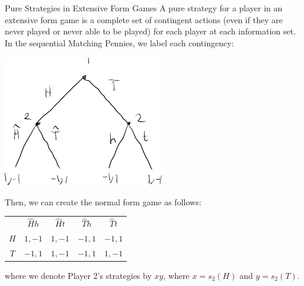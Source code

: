 \documentclass[8pt]{extarticle}
\begin{document}
  \begin{problem}{Pure Strategies in Extensive Form Games}
    A pure strategy for a player in an extensive form game is a complete set of contingent actions (even if they are never played or never able to be played) for each player at each information set. In the sequential Matching Pennies, we label each contingency:
    \begin{center}
      \includegraphics[width=7cm]{images/matching_pennies_pure_strategies.png}
    \end{center}
    Then, we can create the normal form game as follows:
    \begin{center}
      \renewcommand{\arraystretch}{1.5}
      \begin{tabular}{c|c|c|c|c|}
        \multicolumn{1}{c}{}& \multicolumn{1}{c}{$\hat{H}h$} & \multicolumn{1}{c}{$\hat{H}t$} & \multicolumn{1}{c}{$\hat{T}h$} & \multicolumn{1}{c}{$\hat{T}t$}\\
        \cline{2-5}
        $H$ & $1,-1$ & $1,-1$ & $-1,1$ & $-1,1$\\
        \cline{2-5}
        $T$ & $-1,1$ & $1,-1$ & $-1,1$ & $1,-1$\\
        \cline{2-5}
      \end{tabular}
    \end{center}
    where we denote Player 2's strategies by $xy$, where $x = s_2(H)$ and $y = s_2(T)$.\newline


\end{problem}
\end{document}
